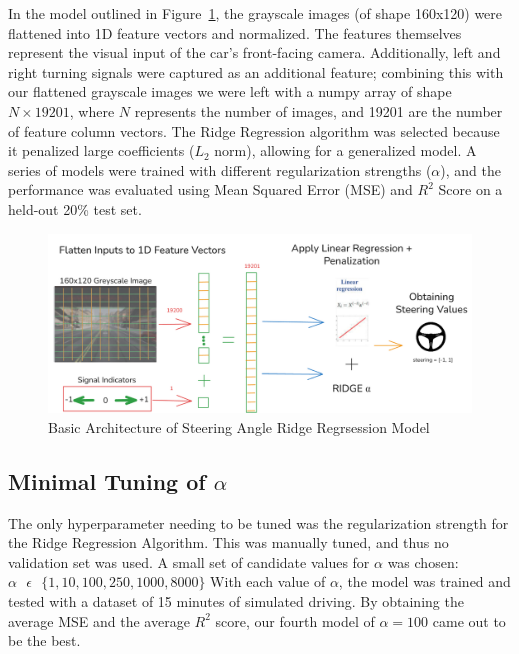 \documentclass{article} %
\begin{document}
In the model outlined in Figure~\ref{fig:diagram}, the grayscale images (of shape 160x120) were flattened into 1D feature vectors and normalized. The features themselves
represent the visual input of the car's front-facing camera. Additionally, left and right turning signals were captured as an
additional feature; combining this with our flattened grayscale images we were left with a numpy array of shape $N \times 19201$,
where $N$ represents the number of images, and 19201 are the number of feature column vectors. The Ridge Regression algorithm was
selected because it penalized large coefficients ($L_2$ norm), allowing for a generalized model. A series of models were trained
with different regularization strengths ($\alpha$), and the performance was evaluated using Mean Squared Error (MSE) and $R^2$ Score
on a held-out 20\% test set. 

\begin{figure}[H] %
    \centering
    \includegraphics[width=1.0\textwidth]{diagram.png} %
    \caption{Basic Architecture of Steering Angle  Ridge Regrsession Model}
    \label{fig:diagram}
\end{figure}


\subsection{Minimal Tuning of $\alpha$}
The only hyperparameter needing to be tuned was the regularization strength for the Ridge Regression Algorithm. This was manually tuned,
and thus no validation set was used. A small set of candidate values for $\alpha$ was chosen: $\alpha \text{ } \epsilon \text{ } 
\{ 1, 10, 100, 250, 1000, 8000\}$ With each value of $\alpha$, the model was trained and tested with a dataset of 15 minutes of simulated
driving. By obtaining the average MSE and the average $R^2$ score, our fourth model of $\alpha = 100$ came out to be the best. 
\end{document}
